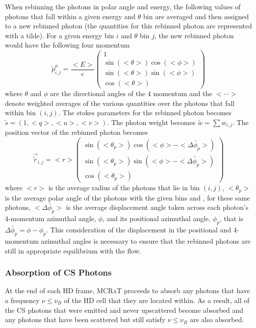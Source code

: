 \documentclass[12pt,a4paper]{article}
\newcommand{\mcrat}{\textsc{MCRaT}}
\begin{document}
When rebinning the photons in polar angle and energy, the following values of photons that fall within a given energy and $\theta$ bin are averaged and then assigned to a new rebinned photon (the quantities for this rebinned photon are represented with a tilde). For a given energy bin $i$ and $\theta$ bin $j$, the new rebinned photon would have the following four momentum  
\[
\tilde{p}^\mu_{i,j}=\frac{<E>}{c}\begin{pmatrix}
1 \\ \sin(<\theta>) \cos(<\phi>) \\ \sin(<\theta>) \sin(<\phi>) \\ \cos(<\theta>)
\end{pmatrix}
\]
where $\theta$ and $\phi$ are the directional angles of the 4 momentum and the $<\cdots>$ denote weighted averages of the various quantities over the photons that fall within bin $(i,j)$. The stokes parameters for the rebinned photon becomes $\tilde{s}=(1,<q>,<u>,<v>)$. The photon weight becomes $\tilde{w}=\sum w_{i,j}$. The position vector of the rebinned photon becomes
 \[
 \overrightarrow{\tilde{r}}_{i,j}=<r>\begin{pmatrix}
  \sin(<\theta_p>) \cos(<\phi>-<\Delta \tilde{\phi_p}>) \\ \sin(<\theta_p>) \sin(<\phi>-<\Delta \tilde{\phi_p}>) \\ \cos(<\theta_p>)
 \end{pmatrix}
 \]
 where $<r>$ is the average radius of the photons that lie in bin $(i,j)$, $<\theta_p>$ is the average polar angle of the photons with the given bins and , for these same photons, $<\Delta \tilde{\phi_p}>$ is the average displacement angle taken across each photon's 4-momentum azimuthal angle, $\phi$, and its positional azimuthal angle, $\phi_p$, that is $\Delta \tilde{\phi_p}= \phi-\phi_p$. This consideration of the displacement in the positional and 4-momentum azimuthal angles is necessary to ensure that the rebinned photons are still in appropriate equilibrium with the flow. 


\subsubsection{Absorption of CS Photons}
At the end of each HD frame, \mcrat{} proceeds to absorb any photons that have a frequency  $\nu \le \nu_B$ of the HD cell that they are located within. As a result, all of the CS photons that were emitted and never upscattered become absorbed and any photons that have been scattered but still satisfy  $\nu \le \nu_B$ are also absorbed.
\end{document}
